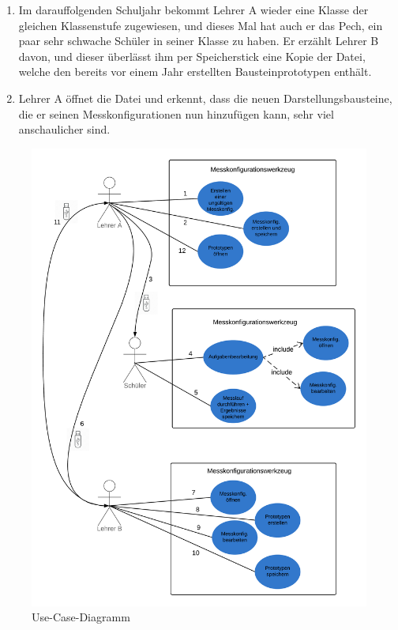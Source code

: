 \documentclass[parskip=full]{scrartcl}
\begin{document}
\begin{enumerate}
	\item Im darauffolgenden Schuljahr bekommt Lehrer A wieder eine Klasse der gleichen Klassenstufe zugewiesen, und dieses Mal hat auch er das Pech, ein paar sehr schwache Schüler in seiner Klasse zu haben. Er erzählt Lehrer B davon, und dieser überlässt ihm per Speicherstick eine Kopie der Datei, welche den bereits vor einem Jahr erstellten Bausteinprototypen enthält. 	
	
	\item Lehrer A öffnet die Datei und erkennt, dass die neuen Darstellungsbausteine, die er seinen Messkonfigurationen nun hinzufügen kann, sehr viel anschaulicher sind.
\end{enumerate}


\begin{figure}[h]
	\begin{center}
		\includegraphics[width = 12cm]{Grafik/UseCaseDiagram.png}
		\caption{Use-Case-Diagramm}
		\label{UseCaseDiagramm}
	\end{center}
\end{figure}
\end{document}
